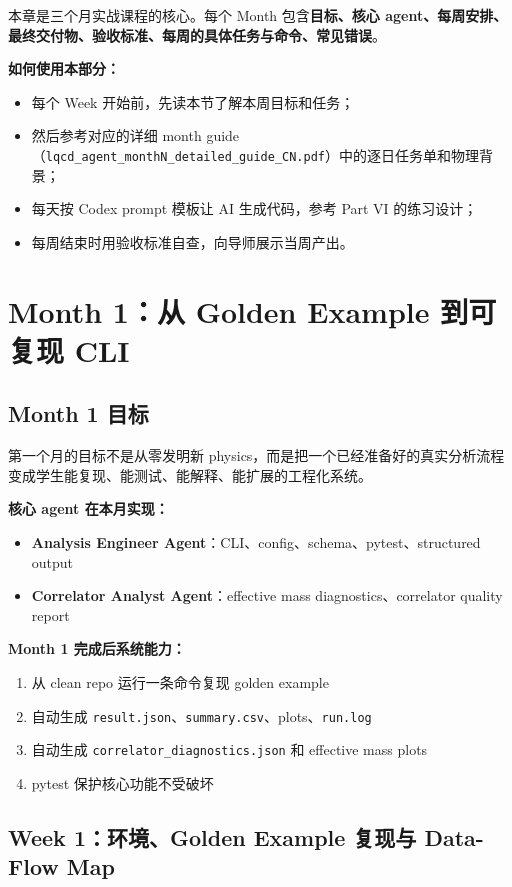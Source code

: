 \documentclass[11pt,a4paper,fontset=fandol]{ctexart}
\begin{document}
本章是三个月实战课程的核心。每个 Month 包含\textbf{目标、核心 agent、每周安排、最终交付物、验收标准、每周的具体任务与命令、常见错误}。

\textbf{如何使用本部分：}
\begin{itemize}
  \item 每个 Week 开始前，先读本节了解本周目标和任务；
  \item 然后参考对应的详细 month guide（\texttt{lqcd\_agent\_monthN\_detailed\_guide\_CN.pdf}）中的逐日任务单和物理背景；
  \item 每天按 Codex prompt 模板让 AI 生成代码，参考 Part VI 的练习设计；
  \item 每周结束时用验收标准自查，向导师展示当周产出。
\end{itemize}

\newpage

\section{Month 1：从 Golden Example 到可复现 CLI}

\subsection{Month 1 目标}

第一个月的目标不是从零发明新 physics，而是把一个已经准备好的真实分析流程变成学生能复现、能测试、能解释、能扩展的工程化系统。

\textbf{核心 agent 在本月实现：}
\begin{itemize}
  \item \textbf{Analysis Engineer Agent}：CLI、config、schema、pytest、structured output
  \item \textbf{Correlator Analyst Agent}：effective mass diagnostics、correlator quality report
\end{itemize}

\textbf{Month 1 完成后系统能力：}
\begin{enumerate}
  \item 从 clean repo 运行一条命令复现 golden example
  \item 自动生成 \texttt{result.json}、\texttt{summary.csv}、plots、\texttt{run.log}
  \item 自动生成 \texttt{correlator\_diagnostics.json} 和 effective mass plots
  \item pytest 保护核心功能不受破坏
\end{enumerate}

\subsection{Week 1：环境、Golden Example 复现与 Data-Flow Map}
\end{document}
